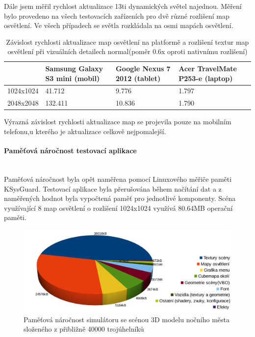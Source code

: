 \documentclass[11pt,twoside,a4paper]{book}
\begin{document}
Dále jsem měřil rychlost aktualizace 13ti dynamických světel najednou. Měření bylo provedeno na všech testovacích zařízeních pro dvě různé rozlišení map osvětlení. Ve všech případech se světla rozkládala na osmi mapách osvětlení.

\begin{table}[h!]
\begin{center}
\begin{tabular}{|p{35mm}|p{35mm}|p{35mm}|p{35mm}|}
\hline
& \textbf{Samsung Galaxy S3 mini (mobil)} & \textbf{Google Nexus 7 2012 (tablet)} & \textbf{Acer TravelMate P253-e (laptop)} \\
\hline
1024x1024 & 41.712 & 9.776 & 1.797 \\ \hline
2048x2048 & 132.411 & 10.836 & 1.790 \\ \hline
\end{tabular}
\caption{Závislost rychlosti aktualizace map osvětlení na platformě a rozlišení textur map osvětlení při vizuálních detailech normal(poměr 0.6x oproti nativnímu rozlišení)}
\end{center}
\end{table}

Výrazná závislost rychlosti aktualizace map se projevila pouze na mobilním telefonu,\linebreak u kterého je aktualizace celkově nejpomalejší. 

\paragraph{Paměťová náročnost testovací aplikace}\ \ \\

Paměťová náročnost byla opět naměřena pomocí Linuxového měřiče paměti KSysGuard. Testovací aplikace byla přerušována během načítání dat a z naměřených hodnot byla vypočtená paměť pro jednotlivé komponenty. Scéna využívající 8 map osvětlení o rozlišení 1024x1024 využívá 80.64MB operační paměti.

\begin{figure}[h!]
\includegraphics[width=150mm]{figures/sim-mem-usage.png}
\caption{Paměťová náročnost simulátoru se scénou 3D modelu nočního města složeného z přibližně 40000 trojúhelníků }
\end{figure}
\end{document}
